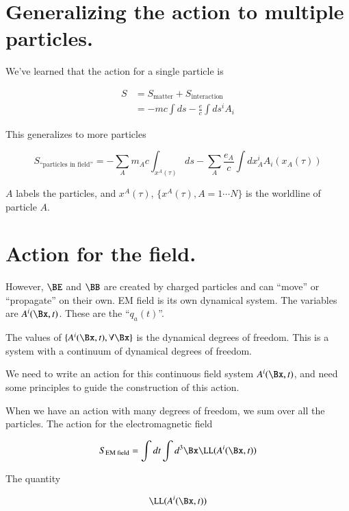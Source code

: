 \section{Generalizing the action to multiple particles.}

We've learned that the action for a single particle is

\begin{align*}
S 
&= S_{\text{matter}} + S_{\text{interaction}} \\
&= -m c \int ds - \frac{e}{c} \int ds^i A_i
\end{align*}

This generalizes to more particles 

\begin{equation}\label{eqn:relativisticElectrodynamicsL12:70}
S_{\text{``particles in field''}}
= 
-
\sum_A 
m_A c \int_{x^A(\tau)} ds 
- 
\sum_A 
\frac{e_A}{c} \int dx^i_A A_i(x_A(\tau))
\end{equation}

$A$ labels the particles, and $x^A(\tau)$, $\{x^A(\tau), A= 1 \cdots N\}$ is the worldline of particle $A$.

\section{Action for the field.}

However, $\BE$ and $\BB$ are created by charged particles and can ``move'' or ``propagate'' on their own.  EM field is its own dynamical system.  The variables are $A^i(\Bx, t)$.  These are the ``$q_a(t)$''.

The values of $\{A^i(\Bx, t), \forall \Bx\}$ is the dynamical degrees of freedom.  This is a system with a continuum of dynamical degrees of freedom.

We need to write an action for this continuous field system $A^i(\Bx,t)$, and need some principles to guide the construction of this action.

When we have an action with many degrees of freedom, we sum over all the particles.  The action for the electromagnetic field 

\begin{equation}\label{eqn:relativisticElectrodynamicsL12:90}
S_{\text{EM field}} = \int dt \int d^3\Bx \LL(A^i(\Bx, t))
\end{equation}

The quantity 

\begin{equation}\label{eqn:relativisticElectrodynamicsL12:110}
\LL(A^i(\Bx, t))
\end{equation}

